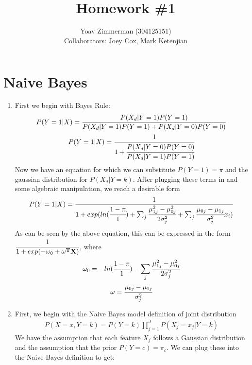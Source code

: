 \documentclass[12pt]{article}
\begin{document}
\title{Homework \#1}
\author{Yoav Zimmerman (304125151) \\
	   Collaborators: Joey Cox, Mark Ketenjian}
\maketitle

\section{Naive Bayes}
\begin{enumerate}[label=\alph*.]
    \item 
	First we begin with Bayes Rule:
	\begin{gather*}
	    P(Y=1 | X) = \frac{P(X_d | Y=1)P(Y=1)}{P(X_d | Y=1)P(Y=1) + P(X_d | Y=0)P(Y=0)} \\
	    P(Y=1 | X) = \cfrac{1}{1 + \cfrac{P(X_d | Y=0)P(Y=0)}{P(X_d | Y=1)P(Y=1)}} \\
	\end{gather*}
	Now we have an equation for which we can substitute \( P(Y=1) = \pi \) and the gaussian distribution for \( P(X_d | Y = k) \). After plugging these terms in and some algebraic manipulation, we reach a desirable form
	\begin{gather*}
	    P(Y=1 | X) = \frac{1}{1 + exp(ln(\cfrac{1 - \pi}{1}) + \sum_j{\cfrac{\mu_{1j}^2 - \mu_{0j}^2}{2 \sigma_j^2}} + \sum_j{\cfrac{\mu_{0j} - \mu_{1j}}{\sigma_j^2}x_i})} \\
	\end{gather*}
	As can be seen by the above equation, this can be expressed in the form $ \cfrac{1}{1 + exp(-\omega_0 + \mathbf{\omega^T X})} $, where 
	\begin{gather*}
	    \omega_0 = -ln(\cfrac{1 - \pi}{1}) - \sum_j{\cfrac{\mu_{1j}^2 - \mu_{0j}^2}{2 \sigma_j^2}} \\
	    \mathbf{\omega} = \cfrac{\mu_{0j} - \mu_{1j}}{\sigma_j^2}
	\end{gather*}
    \item
	First, we begin with the Naive Bayes model definition of joint distribution
	\begin{gather*}
	    P(X = x, Y = k) = P(Y = k) \prod_{j=1}^{J}{P(X_j = x_j | Y =k)}
	\end{gather*}
	We have the assumption that each feature \(X_j\) follows a Gaussian distribution and the assumption that the prior \( P(Y = c) = \pi_c \). We can plug these into the Naive Bayes definition to get:
	\begin{gather*}

\end{gather*}
\end{enumerate}
\end{document}
